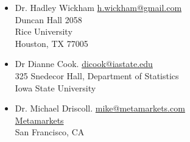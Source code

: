 \documentclass[oneside]{article}
\begin{document}
  \begin{itemize}
  
    \item Dr. Hadley Wickham  \href{mailto:h.wickham@gmail.com}{h.wickham@gmail.com}\\
      Duncan Hall 2058\\
      Rice University\\
      Houston, TX 77005

    \item Dr Dianne Cook.  \href{mailto:dicook@iastate.edu}{dicook@iastate.edu}\\
      325 Snedecor Hall, Department of Statistics \\
      Iowa State University

    \item Dr. Michael Driscoll. \href{mailto:mike@metamarkets.com}{mike@metamarkets.com}\\
      \href{http://www.metamarkets.com}{Metamarkets}\\
      San Francisco, CA

  \end{itemize}
  
\end{document}
